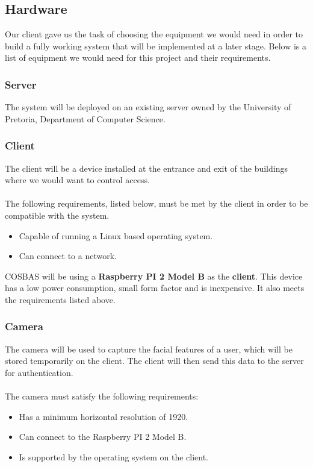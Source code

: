 \subsection{Hardware}
Our client gave us the task of choosing the equipment we would need in order to build a fully working system that will be implemented at a later stage. Below is a list of equipment we would need for this project and their requirements.

	\subsubsection{Server}
	The system will be deployed on an existing server owned by the University of Pretoria, Department of Computer Science.
	
	\subsubsection{Client}
	The client will be a device installed at the entrance and exit of the buildings where we would want to control access.\\
\\
 The following requirements, listed below, must be met by the client in order to be compatible with the system.
	\begin{itemize}
		\item Capable of running a Linux based operating system.
		\item Can connect to a network.
	\end{itemize}
	
COSBAS will be using a \textbf{Raspberry PI 2 Model B} as the \textbf{client}. This device has a low power consumption, small form factor and is inexpensive. It also meets the requirements listed above. 

	\subsubsection{Camera}
	The camera will be used to capture the facial features of a user, which will be stored temporarily on the client. The client will then send this data to the server for authentication.\\
\\
The camera must satisfy the following requirements:
	\begin{itemize}
		\item Has a minimum horizontal resolution of 1920. %
		\item Can connect to the Raspberry PI 2 Model B.
		\item Is supported by the operating system on the client.
	\end{itemize}

